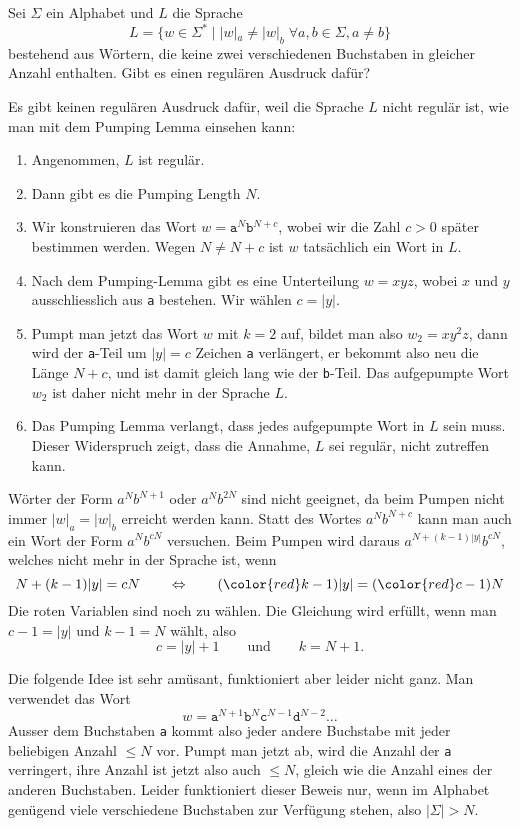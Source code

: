 Sei $\Sigma$ ein Alphabet und $L$ die Sprache
\[
L=\{ w\in\Sigma^* \;|\; |w|_a \ne |w|_b\;\forall a,b\in\Sigma, a\ne b\}
\]
bestehend aus Wörtern, die keine zwei verschiedenen Buchstaben in gleicher
Anzahl enthalten.
Gibt es einen regulären Ausdruck dafür?

\begin{loesung}
Es gibt keinen regulären Ausdruck dafür, weil die Sprache $L$ nicht regulär
ist, wie man mit dem Pumping Lemma einsehen kann:
\begin{enumerate}
\item Angenommen, $L$ ist regulär.
\item Dann gibt es die Pumping Length $N$.
\item Wir konstruieren das Wort $w=\texttt{a}^N\texttt{b}^{N+c}$, wobei
wir die Zahl $c>0$ später bestimmen werden.
Wegen $N\ne N+c$ ist $w$ tatsächlich ein Wort in $L$.
\item Nach dem Pumping-Lemma gibt es eine Unterteilung $w=xyz$, wobei
$x$ und $y$ ausschliesslich aus \texttt{a} bestehen.
Wir wählen $c=|y|$.
\item Pumpt man jetzt das Wort $w$ mit $k=2$ auf, bildet man also
$w_2=xy^2z$, dann wird der \texttt{a}-Teil um $|y|=c$ Zeichen \texttt{a}
verlängert, er bekommt also neu die Länge $N+c$, und ist damit gleich
lang wie der \texttt{b}-Teil.
Das aufgepumpte Wort $w_2$ ist daher nicht mehr in der Sprache $L$.
\item Das Pumping Lemma verlangt, dass jedes aufgepumpte Wort in $L$
sein muss.
Dieser Widerspruch zeigt, dass die Annahme, $L$ sei regulär, nicht
zutreffen kann.
\qedhere
\end{enumerate}
\end{loesung}

\begin{diskussion}
Wörter der Form $a^Nb^{N+1}$ oder $a^Nb^{2N}$ sind nicht geeignet, da
beim Pumpen nicht immer $|w|_a=|w|_b$ erreicht werden kann.
Statt des Wortes $a^Nb^{N+c}$ kann man auch ein Wort der Form $a^Nb^{cN}$
versuchen.
Beim Pumpen wird daraus
$a^{N+(k-1)|y|}b^{cN}$, welches nicht mehr in der Sprache ist, wenn
\[
N+(k-1)|y|=cN
\qquad\Leftrightarrow\qquad
({\color{red}k}-1)|y|=({\color{red}c}-1)N
\]
Die {\color{red}roten} Variablen sind noch zu wählen.
Die Gleichung wird erfüllt, wenn man $c-1=|y|$ und $k-1=N$ wählt, also
\[
c=|y|+1\qquad\text{und}\qquad k=N+1.
\]

Die folgende Idee ist sehr amüsant, funktioniert aber leider nicht ganz.
Man verwendet das Wort
\[
w=\texttt{a}^{N+1}\texttt{b}^N\texttt{c}^{N-1}\texttt{d}^{N-2}\dots
\]
Ausser dem Buchstaben \texttt{a} kommt also jeder andere Buchstabe
mit jeder beliebigen Anzahl $\le N$ vor. 
Pumpt man jetzt ab, wird die Anzahl der \texttt{a} verringert, ihre
Anzahl ist jetzt also auch $\le N$, gleich wie die Anzahl eines der
anderen Buchstaben.
Leider funktioniert dieser Beweis nur, wenn im Alphabet genügend viele
verschiedene Buchstaben zur Verfügung stehen, also $|\Sigma| > N$.
\end{diskussion}

